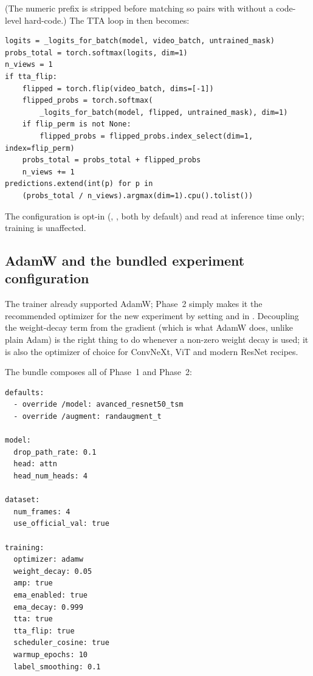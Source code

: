 (The numeric prefix is stripped before matching so
 pairs with 
without a code-level hard-code.) The TTA loop in  then
becomes:

\begin{lstlisting}[style=py]
logits = _logits_for_batch(model, video_batch, untrained_mask)
probs_total = torch.softmax(logits, dim=1)
n_views = 1
if tta_flip:
    flipped = torch.flip(video_batch, dims=[-1])
    flipped_probs = torch.softmax(
        _logits_for_batch(model, flipped, untrained_mask), dim=1)
    if flip_perm is not None:
        flipped_probs = flipped_probs.index_select(dim=1, index=flip_perm)
    probs_total = probs_total + flipped_probs
    n_views += 1
predictions.extend(int(p) for p in
    (probs_total / n_views).argmax(dim=1).cpu().tolist())
\end{lstlisting}

The configuration is opt-in (, ,
both  by default) and read at inference time only; training
is unaffected.

\subsection{AdamW and the bundled experiment configuration}
\label{sec:phase2:adamw}

The trainer already supported AdamW; Phase~2 simply makes it the
recommended optimizer for the new experiment by setting
 and  in . Decoupling the
weight-decay term from the gradient (which is what AdamW does, unlike
plain Adam) is the right thing to do whenever a non-zero weight decay is
used; it is also the optimizer of choice for ConvNeXt, ViT and modern
ResNet recipes.

The  bundle composes all of Phase~1 and
Phase~2:

\begin{lstlisting}[style=yaml]
defaults:
  - override /model: avanced_resnet50_tsm
  - override /augment: randaugment_t

model:
  drop_path_rate: 0.1
  head: attn
  head_num_heads: 4

dataset:
  num_frames: 4
  use_official_val: true

training:
  optimizer: adamw
  weight_decay: 0.05
  amp: true
  ema_enabled: true
  ema_decay: 0.999
  tta: true
  tta_flip: true
  scheduler_cosine: true
  warmup_epochs: 10
  label_smoothing: 0.1
\end{lstlisting}

